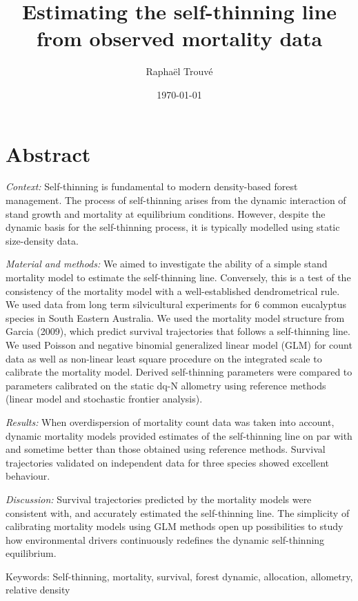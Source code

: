 \documentclass[12pt,english]{article}
\title{Estimating the self-thinning line from observed mortality data}
\author{Raphaël Trouvé}
\date{\today}
\begin{document}
\maketitle

\newpage
\doublespacing
\linenumbers

\section*{Abstract}
  \textit{Context:} Self-thinning is fundamental to modern density-based forest management. The process of self-thinning arises from the dynamic interaction of stand growth and mortality at equilibrium conditions. However, despite the dynamic basis for the self-thinning process, it is typically modelled using static size-density data.
   
  \noindent\textit{Material and methods:} We aimed to investigate the ability of a simple stand mortality model to estimate the self-thinning line. Conversely, this is a test of the consistency of the mortality model with a well-established dendrometrical rule. We used data from long term silvicultural experiments for 6 common eucalyptus species in South Eastern Australia. We used the mortality model structure from Garcia (2009), which predict survival trajectories that follows a self-thinning line. We used Poisson and negative binomial generalized linear model (GLM) for count data as well as non-linear least square procedure on the integrated scale to calibrate the mortality model. Derived self-thinning parameters were compared to parameters calibrated on the static dq-N allometry using reference methods (linear model and stochastic frontier analysis).  
  
  \noindent\textit{Results:} When overdispersion of mortality count data was taken into account, dynamic mortality models provided estimates of the self-thinning line on par with and sometime better than those obtained using reference methods. Survival trajectories validated on independent data for three species showed excellent behaviour.
  
  \noindent\textit{Discussion:} Survival trajectories predicted by the mortality models were consistent with, and accurately estimated the self-thinning line. The simplicity of calibrating mortality models using GLM methods open up possibilities to study how environmental drivers continuously redefines the dynamic self-thinning equilibrium.
  
\bigskip
\textsf{Keywords:} Self-thinning, mortality, survival, forest dynamic, allocation, allometry, relative density
\end{document}
